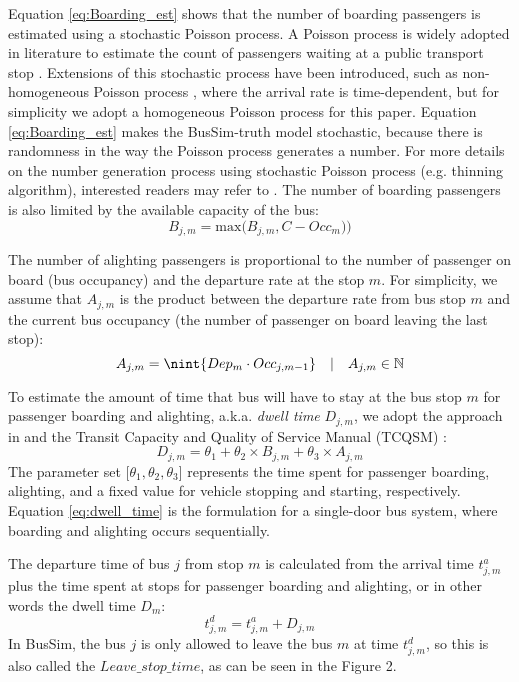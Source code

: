 Equation \ref{eq:Boarding_est} shows that the number of boarding passengers is estimated using a stochastic Poisson process. A Poisson process is widely adopted in literature to estimate the count of passengers waiting at a public transport stop \citep{toledo2010mesoscopic,cats2010mesoscopic}. Extensions of this stochastic process have been introduced, such as non-homogeneous Poisson process \citep{kieu2018stochastic}, where the arrival rate is time-dependent, but for simplicity we adopt a homogeneous Poisson process for this paper. Equation \ref{eq:Boarding_est} makes the BusSim-truth model stochastic, because there is randomness in the way the Poisson process generates a number. For more details on the number generation process using stochastic Poisson process (e.g. thinning algorithm), interested readers may refer to \citep{lewis1979simulation}. The number of boarding passengers is also limited by the available capacity of the bus:
\begin{equation}
B_{j,m} = \text{max} \big( B_{j,m}, C - Occ_m )   \big)
\label{eq:Boarding_limit}
\end{equation}

The number of alighting passengers is proportional to the number of passenger on board (bus occupancy) and the departure rate at the stop $m$.  For simplicity, we assume that $A_{j,m}$ is the product between the departure rate from bus stop $m$ and the current bus occupancy (the number of passenger on board leaving the last stop): 
\begin{equation}
A_{j,m} = \nint{Dep_m \cdot Occ_{j,m-1}} \quad | \quad A_{j,m}\in\mathbb{N}
\end{equation}

To estimate the amount of time that bus will have to stay at the bus stop $m$ for passenger boarding and alighting, a.k.a. \textit{dwell time} $D_{j,m}$, we adopt the approach in \citep{bertini2004modeling} and the Transit Capacity and Quality of Service Manual (TCQSM) \citep{kfh2013transit}:
\begin{equation}
D_{j,m} = \theta_1 + \theta_2 \times B_{j,m} + \theta_3 \times A_{j,m} 
\label{eq:dwell_time}
\end{equation}
The parameter set [$\theta_1,\theta_2,\theta_3$] represents the time spent for passenger boarding, alighting, and a fixed value for vehicle stopping and starting, respectively. Equation \ref{eq:dwell_time} is the formulation for a single-door bus system, where boarding and alighting occurs sequentially. 

The departure time of bus $j$ from stop $m$ is calculated from the arrival time $t^a_{j,m}$ plus the time spent at stops for passenger boarding and alighting, or in other words the dwell time $D_m$:
\begin{equation}
t^d_{j,m} = t^a_{j,m} + D_{j,m}
\end{equation}
In BusSim, the bus $j$ is only allowed to leave the bus $m$ at time $t^d_{j,m}$, so this is also called the $Leave\_stop\_time$, as can be seen in the Figure 2. 

